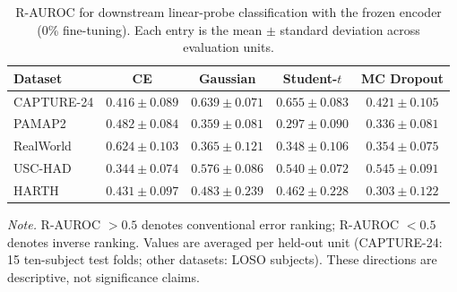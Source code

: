 \begin{table}[t]
\centering
\caption{R-AUROC for downstream linear-probe classification with the frozen encoder (0\% fine-tuning). Each entry is the mean $\pm$ standard deviation across evaluation units.}
\label{tab:har_linear_probe_0}
\small
\setlength{\tabcolsep}{9pt}
\renewcommand{\arraystretch}{1.17}
\begin{tabular}{@{}lcccc@{}}
\toprule
Dataset & CE & Gaussian & Student-$t$ & MC Dropout \\
\midrule
CAPTURE-24 & $0.416 \pm 0.089$ & $0.639 \pm 0.071$ & $0.655 \pm 0.083$ & $0.421 \pm 0.105$ \\
PAMAP2 & $0.482 \pm 0.084$ & $0.359 \pm 0.081$ & $0.297 \pm 0.090$ & $0.336 \pm 0.081$ \\
RealWorld & $0.624 \pm 0.103$ & $0.365 \pm 0.121$ & $0.348 \pm 0.106$ & $0.354 \pm 0.075$ \\
USC-HAD & $0.344 \pm 0.074$ & $0.576 \pm 0.086$ & $0.540 \pm 0.072$ & $0.545 \pm 0.091$ \\
HARTH & $0.431 \pm 0.097$ & $0.483 \pm 0.239$ & $0.462 \pm 0.228$ & $0.303 \pm 0.122$ \\
\bottomrule
\end{tabular}
\par\vspace{3pt}
\begin{minipage}{0.94\textwidth}
\footnotesize\emph{Note.} R-AUROC $>0.5$ denotes conventional error ranking; R-AUROC $<0.5$ denotes inverse ranking. Values are averaged per held-out unit (CAPTURE-24: 15 ten-subject test folds; other datasets: LOSO subjects). These directions are descriptive, not significance claims.
\end{minipage}
\end{table}
